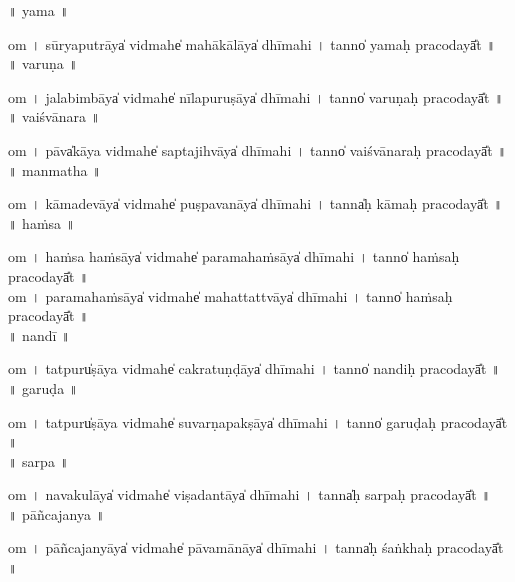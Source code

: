 \documentclass[parskip, DIV=14]{scrartcl}
\begin{document}
\vspace{0.201cm} ॥   yama  ॥ \par
  om  । sū॒rya॒pu॒trāya̍ vi॒dmahe̍ mahākā॒lāya̍ dhīmahi  ।  tanno̍ yamaḥ praco॒dayā̎t ॥ \\

\vspace{0.201cm} ॥   varuṇa ॥ \par
  om  । ja॒la॒bi॒mbāya̍ vi॒dmahe̍ nīlapuru॒ṣāya̍ dhīmahi  ।  tanno̍ varuṇaḥ praco॒dayā̎t ॥ \\

\vspace{0.201cm} ॥   vaiśvānara ॥ \par
  om  । pāva̍kāya vi॒dmahe̍ saptaji॒hvāya̍ dhīmahi  ।  tanno̍ vaiśvānaraḥ praco॒dayā̎t ॥ \\

\vspace{0.201cm} ॥   manmatha ॥ \par
  om  । kā॒ma॒de॒vāya̍ vi॒dmahe̍ puṣpava॒nāya̍ dhīmahi  ।  tanna̍ḥ kāmaḥ praco॒dayā̎t ॥ \\

\vspace{0.201cm} ॥   haṁsa ॥ \par
  om  । ha॒ṁsa॒ ha॒ṁsāya̍ vi॒dmahe̍ paramaha॒ṁsāya̍ dhīmahi  ।  tanno̍ haṁsaḥ praco॒dayā̎t ॥ \\
  om  । pa॒ra॒ma॒ha॒ṁsāya̍ vi॒dmahe̍ mahatta॒ttvāya̍ dhīmahi  ।  tanno̍ haṁsaḥ praco॒dayā̎t ॥ \\

\vspace{0.201cm} ॥   nandī  ॥ \par
  om  । tatpuru̍ṣāya vi॒dmahe̍ cakratu॒ṇḍāya̍ dhīmahi  ।  tanno̍ nandiḥ praco॒dayā̎t ॥ \\

\vspace{0.201cm} ॥   garuḍa  ॥ \par
  om  । tatpuru̍ṣāya vi॒dmahe̍ suvarṇapa॒kṣāya̍ dhīmahi  ।  tanno̍ garuḍaḥ praco॒dayā̎t ॥ \\

\vspace{0.201cm} ॥   sarpa ॥ \par
  om  । na॒va॒ku॒lāya̍ vi॒dmahe̍ viṣada॒ntāya̍ dhīmahi  ।  tanna̍ḥ sarpaḥ praco॒dayā̎t ॥ \\

\vspace{0.201cm} ॥   pāñcajanya  ॥ \par
  om  । pā॒ñca॒ja॒nyāya̍ vi॒dmahe̍ pāvamā॒nāya̍ dhīmahi  ।  tanna̍ḥ śaṅkhaḥ praco॒dayā̎t ॥ \\
\end{document}
